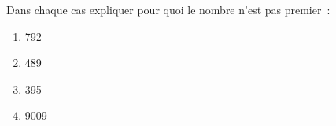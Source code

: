 \documentclass[exercice]{thedocument}%
\begin{document}
%
Dans chaque cas expliquer pour quoi le nombre n'est pas premier~:
\begin{enumerate}
    \item 792
    \item 489
    \item 395
    \item 9009
\end{enumerate}
\end{document}
